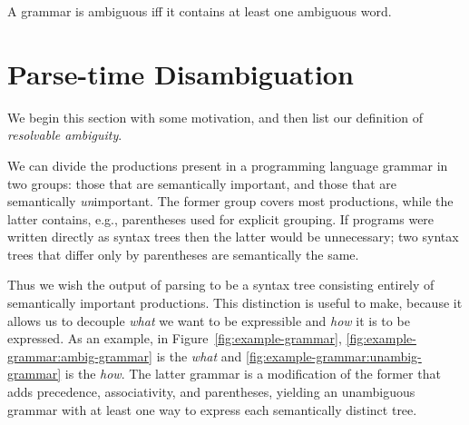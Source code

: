 \documentclass[sigplan]{acmart}\settopmatter{printfolios=true,printccs=false,printacmref=false}
\begin{document}
\noindent A grammar is ambiguous iff it contains at least one ambiguous word.

\section{Parse-time Disambiguation}

We begin this section with some motivation, and then list our definition of \emph{resolvable ambiguity}.

We can divide the productions present in a programming language grammar in two groups: those that are semantically important, and those that are semantically \emph{un}important. The former group covers most productions, while the latter contains, e.g., parentheses used for explicit grouping. If programs were written directly as syntax trees then the latter would be unnecessary; two syntax trees that differ only by parentheses are semantically the same.

Thus we wish the output of parsing to be a syntax tree consisting entirely of semantically important productions. This distinction is useful to make, because it allows us to decouple \emph{what} we want to be expressible and \emph{how} it is to be expressed. As an example, in Figure~\ref{fig:example-grammar}, \ref{fig:example-grammar:ambig-grammar} is the \emph{what} and \ref{fig:example-grammar:unambig-grammar} is the \emph{how}. The latter grammar is a modification of the former that adds precedence, associativity, and parentheses, yielding an unambiguous grammar with at least one way to express each semantically distinct tree.
\end{document}
